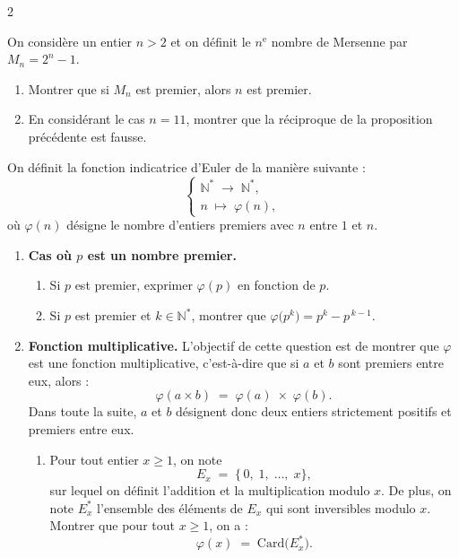 \documentclass[a4paper,12pt]{article}
\begin{document}
\begin{multicols}{2}
\begin{exercice}[title=Exercice 25 $\star\star\star$ { [Raisonner] }]{}{}
  On considère un entier $n > 2$ et on définit le $n^{\text{e}}$ nombre de Mersenne par $M_n = 2^n - 1$.
  \begin{enumerate}
    \item Montrer que si $M_n$ est premier, alors $n$ est premier.
    \item En considérant le cas $n = 11$, montrer que la réciproque de la proposition précédente est fausse.
  \end{enumerate}
\end{exercice}

\begin{exercice}[title=Exercice 27 $\star\star\star$ { [Chercher, Raisonner] }]{}{}
  On définit la fonction indicatrice d'Euler de la manière suivante :
  \[
    \begin{cases}
      \mathbb{N}^* \;\longrightarrow\; \mathbb{N}^*,\\[6pt]
      n \;\longmapsto\; \varphi(n),
    \end{cases}
  \]
  où \(\varphi(n)\) désigne le nombre d'entiers premiers avec \(n\) entre \(1\) et \(n\).

  \begin{enumerate}
    \item \textbf{Cas où \(p\) est un nombre premier.}
      \begin{enumerate}
        \item Si \(p\) est premier, exprimer \(\varphi(p)\) en fonction de \(p\).
        \item Si \(p\) est premier et \(k \in \mathbb{N}^*\), montrer que \(\varphi\bigl(p^k\bigr) = p^k - p^{\,k-1}\).
      \end{enumerate}

    \item \textbf{Fonction multiplicative.}
      L'objectif de cette question est de montrer que \(\varphi\) est une fonction multiplicative, c'est-à-dire que si \(a\) et \(b\) sont premiers entre eux, alors :
      \[
        \varphi(a \times b) \;=\; \varphi(a)\;\times\;\varphi(b).
      \]
      Dans toute la suite, \(a\) et \(b\) désignent donc deux entiers strictement positifs et premiers entre eux.
      \begin{enumerate}
        \item[(a)] Pour tout entier \(x \ge 1\), on note
          \[
            E_x \;=\; \{\,0,\;1,\;\dots,\;x\},
          \]
          sur lequel on définit l'addition et la multiplication modulo \(x\). De plus, on note \(E_x^*\) l'ensemble des éléments de \(E_x\) qui sont inversibles modulo \(x\).
          Montrer que pour tout \(x \ge 1\), on a :
          \[
            \varphi(x) \;=\; \mathrm{Card}\bigl(E_x^*\bigr).
          \]


\end{enumerate}
\end{enumerate}
\end{exercice}
\end{multicols}
\end{document}
